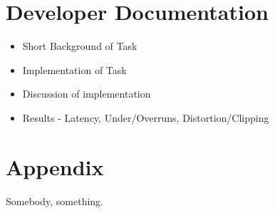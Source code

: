 \documentclass[a4paper,12pt]{report}
\begin{document}
\chapter{Developer Documentation}


\begin{itemize}
    \item Short Background of Task
    \item Implementation of Task
    \item Discussion of implementation
    \item Results - Latency, Under/Overruns, Distortion/Clipping
\end{itemize}



\chapter{Appendix}


\begin{thebibliography}{9}
 Somebody, something.
\end{thebibliography}
\end{document}
